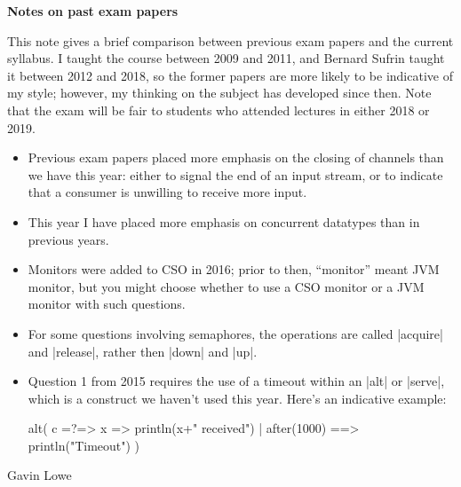 \documentclass[12pt,a4paper]{article}
\begin{document}
\begin{center}
\Large\bf Notes on past exam papers
\end{center}

This note gives a brief comparison between previous exam papers and the
current syllabus.  I taught the course between 2009 and 2011, and Bernard
Sufrin taught it between 2012 and 2018, so the former papers are more likely
to be indicative of my style; however, my thinking on the subject has
developed since then.  Note that the exam will be fair to students who
attended lectures in either 2018 or 2019. 
%
\begin{itemize}
\item Previous exam papers placed more emphasis on the closing of channels
  than we have this year: either to signal the end of an input stream, or to
  indicate that a consumer is unwilling to receive more input.

\item This year I have placed more emphasis on concurrent datatypes than in
  previous years.

\item Monitors were added to CSO in 2016; prior to then, ``monitor'' meant JVM
  monitor, but you might choose whether to use a CSO monitor or a JVM monitor
  with such questions.

\item For some questions involving semaphores, the operations are called
  |acquire| and |release|, rather then |down| and |up|.

\item Question 1 from 2015 requires the use of a timeout within an |alt| or
  |serve|, which is a construct we haven't used this year.  Here's an
  indicative example:
\begin{scala}
  alt(
    c =?=> { x => println(x+" received") }
    | after(1000) ==> { println("Timeout") }
  )
\end{scala}
\end{itemize}

\begin{flushright}
Gavin Lowe
\end{flushright}
\end{document}
